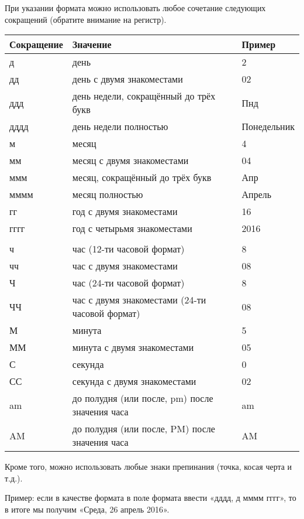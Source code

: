 \documentclass[a4paper,10pt]{article}
\begin{document}
При указании формата можно использовать любое сочетание следующих сокращений (обратите внимание на регистр).

\begin{center}
\begin{tabular}{ | m{} | m{8cm} |  m{3cm} |}
\hline
 \textbf{Сокращение} & \textbf{Значение} & \textbf{Пример}\\ 
 \hline
 д & день & 2\\
\hline
 дд & день с двумя знакоместами & 02\\
\hline
 ддд & день недели, сокращённый до трёх букв& Пнд\\
\hline
 дддд & день недели полностью & Понедельник\\
\hline
 м & месяц & 4\\
\hline
 мм & месяц с двумя знакоместами & 04\\
\hline
 ммм & месяц, сокращённый до  трёх букв & Апр\\
\hline
 мммм & месяц полностью & Апрель\\
\hline
 гг & год с двумя знакоместами & 16\\
\hline
 гггг & год с четырьмя знакоместами & 2016\\
\hline
  &  & \\
\hline
 ч & час (12-ти часовой формат) & 8\\
\hline
 чч & час с двумя знакоместами & 08\\
\hline
 Ч & час (24-ти часовой формат) & 8\\
\hline
 ЧЧ & час с двумя знакоместами (24-ти часовой формат) & 08\\
\hline
 М & минута & 5\\
\hline
 ММ & минута с двумя знакоместами & 05\\
\hline
 С & секунда & 0\\
\hline
 СС & секунда с двумя знакоместами & 02\\
\hline
 am & до полудня (или после, pm) после значения часа & am\\
\hline
AM & до полудня (или после, PM) после значения часа & AM\\
\hline
\end{tabular}
\end{center}

Кроме того, можно использовать любые знаки препинания (точка, косая черта и т.д.).

Пример: если в качестве формата в поле формата ввести «дддд, д мммм гггг», то в итоге мы получим «Среда, 26 апрель 2016».
\end{document}
